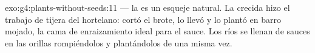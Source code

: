 \begin{solution}{exo:g4:plants-without-seeds:11}
 --- la  es un esqueje natural. La crecida
hizo el trabajo de tijera del hortelano: cortó el brote, lo llevó y lo
plantó en barro mojado, la cama de enraizamiento ideal para el sauce.
Los ríos se llenan de sauces en las orillas rompiéndolos y
plantándolos de una misma vez.
\end{solution}
